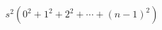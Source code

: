 \documentclass[preview]{standalone}
\begin{document}
\begin{align*}
s^2(0^2+1^2+2^2+\cdots+(n-1)^2)
\end{align*}
\end{document}
